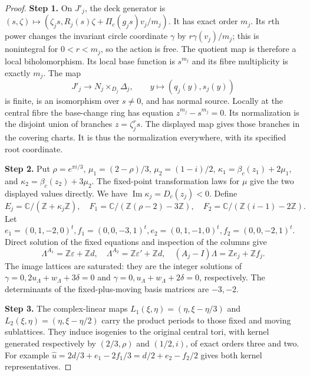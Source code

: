 \documentclass[11pt,a4paper]{article}
\theoremstyle{plain}
\theoremstyle{definition}
\begin{document}
\begin{proof}
\par\smallskip\noindent\textbf{Step 1.} On $J'_j$, the deck generator is
$(s,\zeta)\mapsto(\zeta_js,R_j(s)\zeta+\Pi_c(g_js)v_j/m_j)$. It has exact order $m_j$. Its $r$th power changes the invariant circle coordinate $\gamma$ by $r\gamma(v_j)/m_j$; this is nonintegral for $0<r<m_j$, so the action is free. The quotient map is therefore a local biholomorphism. Its local base function is $s^{m_j}$ and its fibre multiplicity is exactly $m_j$. The map
\[
 J'_j\longrightarrow N_j\times_{D_j}\Delta_j,\qquad y\longmapsto(q_j(y),s_j(y))
\]
is finite, is an isomorphism over $s\ne0$, and has normal source. Locally at the central fibre the base-change ring has equation $z^{m_j}-s^{m_j}=0$. Its normalization is the disjoint union of branches $z=\zeta_j^rs$. The displayed map gives those branches in the covering charts. It is thus the normalization everywhere, with its specified root coordinate.

\par\smallskip\noindent\textbf{Step 2.} Put $\rho=e^{\pi i/3}$, $\mu_1=(2-\rho)/3$, $\mu_2=(1-i)/2$, $\kappa_1=\beta_c(z_1)+2\mu_1$, and $\kappa_2=\beta_c(z_2)+3\mu_2$. The fixed-point transformation laws for $\mu$ give the two displayed values directly. We have $\operatorname{Im}\kappa_j=D_c(z_j)<0$. Define
\[
 E_j=\mathbb C/(\mathbb Z+\kappa_j\mathbb Z),\quad
 F_1=\mathbb C/(\mathbb Z(\rho-2)-3\mathbb Z),\quad
 F_2=\mathbb C/(\mathbb Z(i-1)-2\mathbb Z).
\]
Let $e_1=(0,1,-2,0)^t,f_1=(0,0,-3,1)^t,e_2=(0,1,-1,0)^t,f_2=(0,0,-2,1)^t$. Direct solution of the fixed equations and inspection of the columns give
\[
 \Lambda^{A_1}=\mathbb Z\varepsilon+\mathbb Zd,\quad
 \Lambda^{A_2}=\mathbb Z\varepsilon'+\mathbb Zd,\quad
 (A_j-I)\Lambda=\mathbb Ze_j+\mathbb Zf_j.
\]
The image lattices are saturated: they are the integer solutions of $\gamma=0,2u_{\Lambda}+w_{\Lambda}+3\delta=0$ and $\gamma=0,u_{\Lambda}+w_{\Lambda}+2\delta=0$, respectively. The determinants of the fixed-plus-moving basis matrices are $-3,-2$.

\par\smallskip\noindent\textbf{Step 3.} The complex-linear maps $L_1(\xi,\eta)=(\eta,\xi-\eta/3)$ and $L_2(\xi,\eta)=(\eta,\xi-\eta/2)$ carry the product periods to those fixed and moving sublattices. They induce isogenies to the original central tori, with kernel generated respectively by $(2/3,\rho)$ and $(1/2,i)$, of exact orders three and two. For example $\widehat u=2d/3+e_1-2f_1/3=d/2+e_2-f_2/2$ gives both kernel representatives.


\end{proof}
\end{document}
